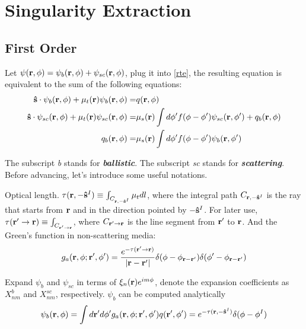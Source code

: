 \documentclass[main]{subfiles}
\begin{document}
\section{Singularity Extraction}
\label{sec:singularity extraction}
\subsection{First Order}
\label{sub:first order}
Let $\psi(\mathbf{r},\phi)=\psi_b(\mathbf{r},\phi)+\psi_{sc}(\mathbf{r},\phi)$, plug it
into \eqref{rte}, the resulting equation is equivalent to the sum of the
following equations:
\begin{align*}
	\mathbf{\hat{s}}\cdot\psi_b(\mathbf{r},\phi)+\mu_t(\mathbf{r})\psi_b(\mathbf{r},\phi)
	=&q(\mathbf{r},\phi) \\
	\mathbf{\hat{s}}\cdot\psi_{sc}(\mathbf{r},\phi)+\mu_t(\mathbf{r})\psi_{sc}(\mathbf{r},\phi)
	=&\mu_s(\mathbf{r})\int d\phi^{\prime} f(\phi-\phi^{\prime})\psi_{sc}(\mathbf{r},\phi^{\prime})
	+q_b(\mathbf{r},\phi) \\
	q_b(\mathbf{r},\phi)=&\mu_s(\mathbf{r})\int d\phi^{\prime} f(\phi-\phi^{\prime})\psi_b(\mathbf{r},\phi^{\prime})
\end{align*}

The subscript \textit{b} stands for \textit{\bf ballistic}.
The subscript \textit{sc} stands for \textit{\bf scattering}.
Before advancing, let's introduce some useful notations.

Optical length. $\tau(\mathbf{r},-\mathbf{\hat{s}}^I)\equiv\int_{C_{\mathbf{r},-\mathbf{\hat{s}}^I}}\mu_t dl$, where the
integral path $C_{\mathbf{r},-\mathbf{\hat{s}}^I}$ is the ray that starts from $\mathbf{r}$ and in
the direction pointed by $-\mathbf{\hat{s}}^I$. For later use,
$\tau(\mathbf{r}^{\prime}\to\mathbf{r}) \equiv \int_{C_{\mathbf{r}^{\prime}\to\mathbf{r}}}$, where
$C_{\mathbf{r}^{\prime}\to\mathbf{r}}$ is the line segment from $\mathbf{r}^{\prime}$ to $\mathbf{r}$.
And the Green's function in non-scattering media:
\begin{equation*}
	g_a(\mathbf{r},\phi;\mathbf{r}^{\prime},\phi^{\prime}) =
	\frac{e^{-\tau(\mathbf{r}^{\prime}\to\mathbf{r})}}{\left| \mathbf{r}-\mathbf{r}^{\prime} \right|}
	\delta(\phi-\phi_{\mathbf{r}-\mathbf{r}^{\prime}})
	\delta(\phi^{\prime}-\phi_{\mathbf{r}-\mathbf{r}^{\prime}})
\end{equation*}

Expand $\psi_b$ and $\psi_{sc}$ in terms of $\xi_n(\mathbf{r})e^{i m \phi}$, denote
the expansion coefficients as $X^b_{nm}$ and $X^{sc}_{nm}$, respectively.
$\psi_b$ can be computed analytically
\begin{equation*} 
	\begin{split}
		\psi_b(\mathbf{r},\phi) = \int d\mathbf{r}^{\prime} d\phi^{\prime}
		g_a(\mathbf{r},\phi;\mathbf{r}^{\prime},\phi^{\prime}) q(\mathbf{r}^{\prime},\phi^{\prime}) 
		= e^{-\tau(\mathbf{r},-\mathbf{\hat{s}}^I)} \delta(\phi-\phi^I)
	\end{split}
\end{equation*}
\end{document}
